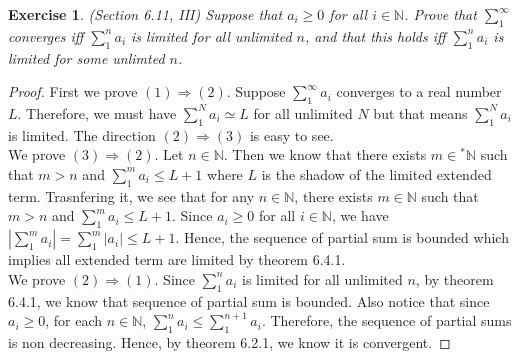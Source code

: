 \documentclass[a4paper, 11pt, openany]{book}
\theoremstyle{plain}
\newtheorem{exercise}{Exercise}[chapter]
\theoremstyle{plain}
\newcommand{\N}{\mathbb{N}}
\newcommand{\hyp}{{}^*}
\begin{document}
  \begin{exercise}
    (Section 6.11, III)
      Suppose that $a_i \geq 0$ for all $i \in \N$. Prove that $\sum_{1}^\infty$ converges iff $\sum_{1}^n a_i$ is limited for all unlimited $n$, and that this holds iff $\sum_{1}^n a_i$ is limited for some unlimted $n$.
  \end{exercise}
  \begin{proof}
      First we prove $(1) \Rightarrow (2)$. Suppose $\sum_{1}^\infty a_i$ converges to a real number $L$. Therefore, we must have $\sum_{1}^N a_i \simeq L$ for all unlimited $N$ but that means $\sum_{1}^N a_i$ is limited. The direction $(2) \Rightarrow (3)$ is easy to see. \\

      We prove $(3) \Rightarrow (2)$. Let $n \in \N$. Then we know that there exists $m \in \hyp \N$ such that $m>n$ and $\sum_{1}^m a_i \leq L+1$ where $L$ is the shadow of the limited extended term. Trasnfering it, we see that for any $n \in \N$, there exists $m \in \N$ such that $m>n$ and $\sum_{1}^m a_i \leq L+1$. Since $a_i \geq 0$ for all $i \in \N$, we have $\left| \sum_{1}^m a_i \right|=\sum_{1}^m |a_i| \leq L+1$. Hence, the sequence of partial sum is bounded which implies all extended term are limited by theorem 6.4.1. \\

      We prove $(2) \Rightarrow (1)$. Since $\sum_{1}^n a_i$ is limited for all unlimited $n$, by theorem 6.4.1, we know that sequence of partial sum is bounded. Also notice that since $a_i \geq 0$, for each $n \in \N$, $\sum_{1}^n a_i \leq \sum_{1}^{n+1} a_i$. Therefore, the sequence of partial sums is non decreasing. Hence, by theorem 6.2.1, we know it is convergent. 
  \end{proof}
\end{document}
